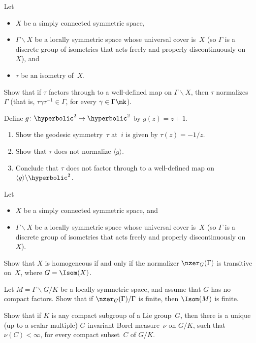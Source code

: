 \begin{exercises}

\item
 Let
 \begin{itemize}
 \item $X$ be a simply connected symmetric space, 
 \item $\Gamma \backslash X$ be a locally symmetric space whose
universal cover is~$X$ (so $\Gamma$ is a discrete group of isometries
that acts freely and properly discontinuously on~$X$), and
 \item $\tau$ be an isometry of~$X$.
 \end{itemize}
 Show that if $\tau$ factors through to a well-defined map on $\Gamma
\backslash X$, then $\tau$ normalizes~$\Gamma$ (that is, $\tau
\gamma \tau^{-1} \in \Gamma$, for every $\gamma \in \Gamma\mk$).

\item \label{GrpCuspNotSymm}
 Define $g \colon \hyperbolic^2 \to \hyperbolic^2$ by $g(z) = z+1$. 
 \begin{enumerate}
 \item Show the geodesic symmetry~$\tau$ at~$i$ is given by
$\tau(z) = -1/z$.
 \item Show that $\tau$ does not normalize $\langle g \rangle$.
 \item Conclude that $\tau$ does not factor through to a well-defined
map on $\langle g \rangle \backslash \hyperbolic^2$.
 \end{enumerate}

\item
 Let
 \begin{itemize}
 \item $X$ be a simply connected symmetric space, and
 \item $\Gamma \backslash X$ be a locally symmetric space whose
universal cover is~$X$ (so $\Gamma$ is a discrete group of isometries
that acts freely and properly discontinuously on~$X$).
 \end{itemize}
 Show that $X$ is homogeneous if and only if the normalizer
$\nzer_G(\Gamma)$ is transitive on~$X$, where $G = \Isom(X)$.

\item Let $M = \Gamma \backslash G/K$ be a locally symmetric space,
and assume that $G$ has no compact factors. Show that if
$\nzer_G(\Gamma)/\Gamma$ is finite, then $\Isom(M)$ is finite.

\item Show that if $K$ is any compact subgroup of a Lie group~$G$,
then there is a unique (up to a scalar multiple) $G$-invariant Borel
measure~$\nu$ on $G/K$, such that $\nu(C) < \infty$, for every
compact subset~$C$ of $G/K$.


\end{exercises}
